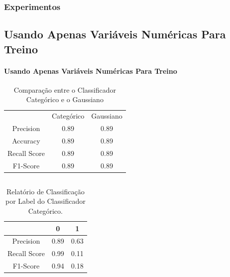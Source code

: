 \documentclass{beamer}
\begin{document}
\begin{frame}
    \frametitle{Experimentos}
    \subsection{Usando Apenas Variáveis Numéricas Para Treino}
    \framesubtitle{Usando Apenas Variáveis Numéricas Para Treino}
    \begin{table}[H]
        \centering
        \caption{\label{tab:cr3-gt} Comparação entre o Classificador Categórico e o Gaussiano}
        \begin{small}
            \begin{tabular}{ccc}
                \\
                \\
                \hline
                                        & Categórico       & Gaussiano\\
                \hline
                Precision               & 0.89             & 0.89\\
                Accuracy                & 0.89             & 0.89\\
                Recall Score            & 0.89             & 0.89\\
                F1-Score                & 0.89             & 0.89\\
                
                \hline
            \end{tabular}
        \end{small}
    \end{table}


        \begin{columns}
            \begin{column}{0.5\textwidth}
                \begin{table}[H]
                    \caption{\label{tab:cr3-cnb} Relatório de Classificação por Label do Classificador Categórico.}
                    \centering
                    \begin{small}
                        \begin{tabular}{ccc}
                        
                            \hline
                                                    & 0                & 1\\
                            \hline
                            Precision               & 0.89             & 0.63\\
                            Recall Score            & 0.99             & 0.11\\
                            F1-Score                & 0.94             & 0.18\\
                            

\end{tabular}
\end{small}
\end{table}
\end{column}
\end{columns}
\end{frame}
\end{document}
